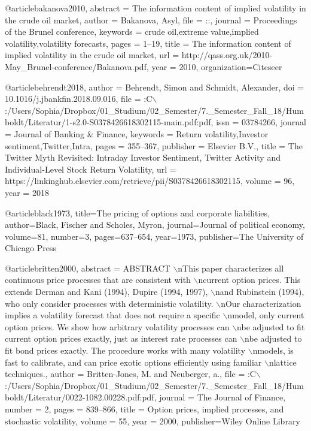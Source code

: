@article{bakanova2010,
abstract = {The information content of implied volatility in the crude oil market},
author = {Bakanova, Asyl},
file = {::},
journal = {Proceedings of the Brunel conference},
keywords = {crude oil,extreme value,implied volatility,volatility forecasts},
pages = {1--19},
title = {{The information content of implied volatility in the crude oil market}},
url = {http://qass.org.uk/2010-May{\_}Brunel-conference/Bakanova.pdf},
year = {2010},
organization={Citeseer}
}


@article{behrendt2018,
author = {Behrendt, Simon and Schmidt, Alexander},
doi = {10.1016/j.jbankfin.2018.09.016},
file = {:C$\backslash$:/Users/Sophia/Dropbox/01{\_}Studium/02{\_}Semester/7.{\_}Semester{\_}Fall{\_}18/Humboldt/Literatur/1-s2.0-S0378426618302115-main.pdf:pdf},
issn = {03784266},
journal = {Journal of Banking {\&} Finance},
keywords = {Return volatility,Investor sentiment,Twitter,Intra},
pages = {355--367},
publisher = {Elsevier B.V.},
title = {{The Twitter Myth Revisited: Intraday Investor Sentiment, Twitter Activity and Individual-Level Stock Return Volatility}},
url = {https://linkinghub.elsevier.com/retrieve/pii/S0378426618302115},
volume = {96},
year = {2018}
}

@article{black1973,
  title={The pricing of options and corporate liabilities},
  author={Black, Fischer and Scholes, Myron},
  journal={Journal of political economy},
  volume={81},
  number={3},
  pages={637--654},
  year={1973},
  publisher={The University of Chicago Press}
}

@article{britten2000,
abstract = {ABSTRACT $\backslash$nThis paper characterizes all continuous price processes that are consistent with $\backslash$ncurrent option prices. This extends Derman and Kani (1994), Dupire (1994, 1997), $\backslash$nand Rubinstein (1994), who only consider processes with deterministic volatility. $\backslash$nOur characterization implies a volatility forecast that does not require a specific $\backslash$nmodel, only current option prices. We show how arbitrary volatility processes can $\backslash$nbe adjusted to fit current option prices exactly, just as interest rate processes can $\backslash$nbe adjusted to fit bond prices exactly. The procedure works with many volatility $\backslash$nmodels, is fast to calibrate, and can price exotic options efficiently using familiar $\backslash$nlattice techniques.},
author = {Britten-Jones, M. and Neuberger, a.},
file = {:C$\backslash$:/Users/Sophia/Dropbox/01{\_}Studium/02{\_}Semester/7.{\_}Semester{\_}Fall{\_}18/Humboldt/Literatur/0022-1082.00228.pdf:pdf},
journal = {The Journal of Finance},
number = {2},
pages = {839--866},
title = {{Option prices, implied processes, and stochastic volatility}},
volume = {55},
year = {2000},
publisher={Wiley Online Library}
}

